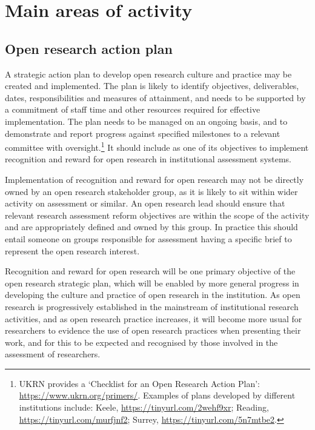 \documentclass[
  letterpaper,
  DIV=11,
  numbers=noendperiod,
  oneside]{scrreprt}
\begin{document}
\section{Main areas of activity}\label{main-areas-of-activity-2}

\subsection{Open research action plan}\label{open-research-action-plan}

A strategic action plan to develop open research culture and practice
may be created and implemented. The plan is likely to identify
objectives, deliverables, dates, responsibilities and measures of
attainment, and needs to be supported by a commitment of staff time and
other resources required for effective implementation. The plan needs to
be managed on an ongoing basis, and to demonstrate and report progress
against specified milestones to a relevant committee with
oversight.\footnote{UKRN provides a `Checklist for an Open Research
  Action Plan': \url{https://www.ukrn.org/primers/}. Examples of plans
  developed by different institutions include: Keele,
  \url{https://tinyurl.com/2wehf9xr}; Reading,
  \url{https://tinyurl.com/murfjnf2}; Surrey,
  \url{https://tinyurl.com/5n7mtbe2}.} It should include as one of its
objectives to implement recognition and reward for open research in
institutional assessment systems.

Implementation of recognition and reward for open research may not be
directly owned by an open research stakeholder group, as it is likely to
sit within wider activity on assessment or similar. An open research
lead should ensure that relevant research assessment reform objectives
are within the scope of the activity and are appropriately defined and
owned by this group. In practice this should entail someone on groups
responsible for assessment having a specific brief to represent the open
research interest.

Recognition and reward for open research will be one primary objective
of the open research strategic plan, which will be enabled by more
general progress in developing the culture and practice of open research
in the institution. As open research is progressively established in the
mainstream of institutional research activities, and as open research
practice increases, it will become more usual for researchers to
evidence the use of open research practices when presenting their work,
and for this to be expected and recognised by those involved in the
assessment of researchers.
\end{document}
